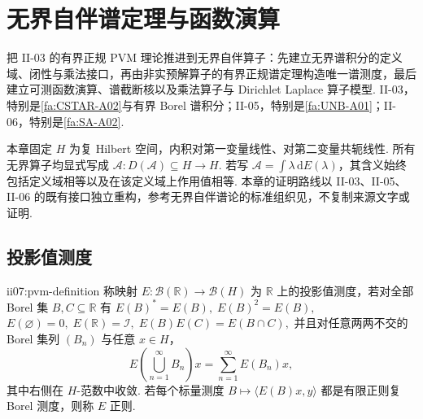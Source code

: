 \chapter{无界自伴谱定理与函数演算}\label{chap:II-07}
\FAChapterOpening
{把 II-03 的有界正规 PVM 理论推进到无界自伴算子：先建立无界谱积分的定义域、闭性与乘法接口，再由非实预解算子的有界正规谱定理构造唯一谱测度，最后建立可测函数演算、谱截断核以及乘法算子与 Dirichlet Laplace 算子模型.}
{II-03，特别是\autoref{fa:CSTAR-A02}与有界 Borel 谱积分；II-05，特别是\autoref{fa:UNB-A01}；II-06，特别是\autoref{fa:SA-A02}.}
{\begin{center}
\end{center}}

本章固定 \(\displaystyle H\) 为复 Hilbert 空间，内积对第一变量线性、对第二变量共轭线性. 所有无界算子均显式写成 \(\displaystyle\mathcal A:D(\mathcal A)\subseteq H\to H\). 若写 \(\displaystyle\mathcal A=\int\lambda\,\mathrm{d}E(\lambda)\)，其含义始终包括定义域相等以及在该定义域上作用值相等. 本章的证明路线以 II-03、II-05、II-06 的既有接口独立重构，参考无界自伴谱论的标准组织见\cite{reed-simon1980,conway1990}，不复制来源文字或证明.

\newpage
\section{投影值测度}\label{sec:ii07-pvm}

\begin{FADefinition}[A][实轴上的投影值测度]{ii07:pvm-definition}
称映射
\(\displaystyle E:\mathcal B(\mathbb R)\to\mathcal B(H)\)
为 \(\displaystyle\mathbb R\) 上的投影值测度，若对全部 Borel 集 \(\displaystyle B,C\subseteq\mathbb R\) 有
\(\displaystyle E(B)^*=E(B), \; E(B)^2=E(B),\)
\(\displaystyle E(\varnothing)=0, \; E(\mathbb R)=\mathcal I, \; E(B)E(C)=E(B\cap C),\)
并且对任意两两不交的 Borel 集列 \(\displaystyle(B_n)\) 与任意 \(\displaystyle x\in H\)，
\[
E\left(\bigcup_{n=1}^{\infty}B_n\right)x
=
\sum_{n=1}^{\infty}E(B_n)x,
\]
其中右侧在 \(\displaystyle H\)-范数中收敛. 若每个标量测度 \(\displaystyle B\mapsto\langle E(B)x,y\rangle\) 都是有限正则复 Borel 测度，则称 \(\displaystyle E\) 正则.
\end{FADefinition}

